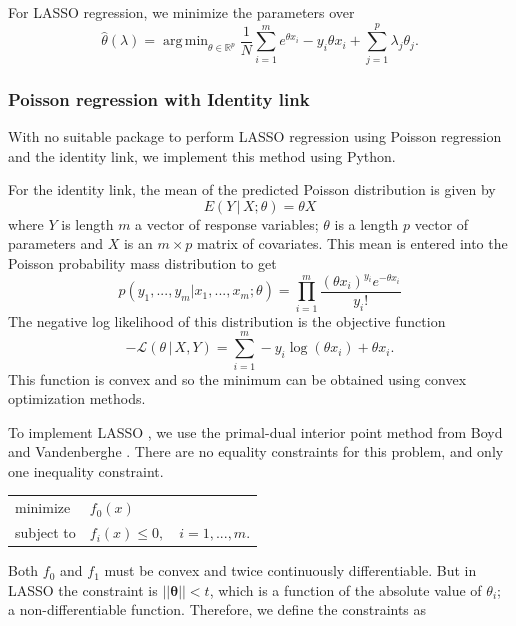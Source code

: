 \documentclass[11pt]{article}
\DeclareMathOperator*{\argmin}{arg\,min}
\begin{document}
For LASSO regression, we minimize the parameters \cite{Young2007} over  
\[\hat{\theta}(\lambda) = \argmin_{\theta\in\mathbb{R}^p}  \frac{1}{N}\sum_{i=1}^m e^{\theta x_i}-y_i\theta x_i  + \sum_{j=1}^p\lambda_j\theta_j.\]


\subsubsection{Poisson regression with Identity link} \label{sec:poisI}

With no suitable package to perform LASSO regression using Poisson regression and the identity link, we implement this method using Python.

For the identity link, the mean of the predicted Poisson distribution is given by $$E(Y\,|\,X;\theta) = \theta X$$ where $Y$ is length $m$ a vector of response variables; $\theta$ is a length $p$ vector of parameters and $X$ is an $m\times p$ matrix of covariates. This mean is entered into the Poisson probability mass distribution to get 
$$p(y_1,...,y_m|x_1,...,x_m;\theta) = \prod_{i=1}^m \frac{\left(\theta x_i\right)^{y_i}e^{-\theta x_i}}{y_i!} $$
The negative log likelihood of this distribution is the objective function
$$-\mathcal{L}\left(\theta\,|\,X, Y\right) = \sum_{i=1}^m -y_i\log{\left(\theta x_i\right)} +\theta x_i. $$ This function is convex and so the minimum can be obtained using convex optimization methods. 

To implement LASSO \cite{Tibshirani1996}, we use the primal-dual interior point method from Boyd and Vandenberghe \cite{Boyd2004}. There are no equality constraints for this problem, and only one inequality constraint.

\begin{center}\begin{tabular}{ll}
minimize &$f_0(x)$\\
subject to &$f_i(x) \leq 0, \quad i = 1, ..., m$.
\end{tabular}\end{center}


 Both $f_0$ and $f_1$ must be convex and twice continuously differentiable. But in LASSO the constraint is $||\boldsymbol{\theta}|| < t$, which is a function of the absolute value of $\theta_i$; a non-differentiable function. Therefore, we define the constraints as 
\end{document}
